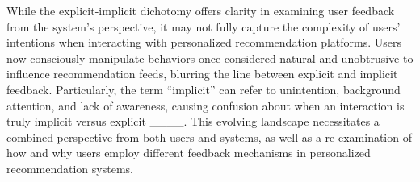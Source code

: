 While the explicit-implicit dichotomy offers clarity in examining user feedback from the system’s perspective, it may not fully capture the complexity of users' intentions when interacting with personalized recommendation platforms. Users now consciously manipulate behaviors once considered natural and unobtrusive to influence recommendation feeds, blurring the line between explicit and implicit feedback. Particularly, the term ``implicit'' can refer to unintention, background attention, and lack of awareness, causing confusion about when an interaction is truly implicit versus explicit ____. 
This evolving landscape necessitates a combined perspective from both users and systems, as well as a re-examination of how and why users employ different feedback mechanisms in personalized recommendation systems.